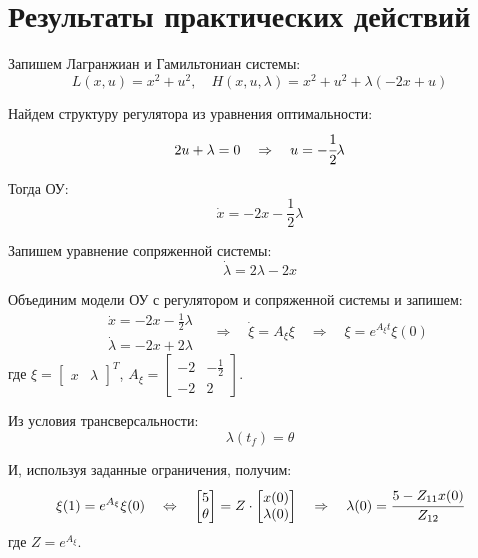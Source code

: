 \section{Результаты практических действий}

Запишем Лагранжиан и Гамильтониан системы:
\begin{equation}
	L(x,u) = x^2 + u^2,
	\quad
	H(x,u,\lambda) = x^2 + u^2 + \lambda (-2 x + u)
\end{equation}

Найдем структуру регулятора из уравнения оптимальности:
\begin{equation}
	2u + \lambda = 0
	\quad\Rightarrow\quad
	u = -\cfrac{1}{2} \lambda
\end{equation}

Тогда ОУ:
\begin{equation}
	\dot x = -2 x - \frac{1}{2}\lambda
\end{equation}

Запишем уравнение сопряженной системы:
\begin{equation}
	\dot\lambda = 2 \lambda - 2 x
\end{equation}

Объединим модели ОУ с регулятором и сопряженной системы и запишем:
\begin{equation}
	\begin{aligned}
		& \dot{x} = - 2 x - \frac{1}{2} \lambda \\
		& \dot \lambda = -2 x + 2 \lambda
	\end{aligned}
	\quad\Rightarrow\quad
	\dot \xi = A_{\xi} \xi
	\quad\Rightarrow\quad
	\xi = e^{A_\xi t} \xi(0)
\end{equation}
где $\xi = \begin{bmatrix}x & \lambda\end{bmatrix}^T\!\!$, $A_{\xi} = \begin{bmatrix}-2 & -\frac{1}{2} \\-2 & 2\end{bmatrix}\!$.

Из условия трансверсальности:
\begin{equation}
	\lambda(t_f) = \theta
\end{equation}

И, используя заданные ограничения, получим:
\begin{equation}
	\xi(1) = e^{A_\xi} \xi(0)
	\quad\Leftrightarrow\quad
	\begin{bmatrix}
		5\\
		\theta
	\end{bmatrix}
	= Z
	\cdot
	\begin{bmatrix}
		x(0) \\
		\lambda(0)
	\end{bmatrix}
	\quad\Rightarrow\quad
	\lambda(0) = \cfrac{5 - Z_{11} x(0)}{Z_{12}}
\end{equation}
где $Z = e^{A_\xi}$.

